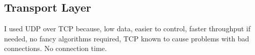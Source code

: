 

\subsection{Transport Layer}

I used UDP over TCP because, low data, easier to control, faster throughput if needed, no fancy algorithms required, TCP known to cause problems with bad connections. No connection time.

